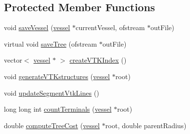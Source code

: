 \subsection*{Protected Member Functions}
\begin{DoxyCompactItemize}
\item 
void \hyperlink{class_abstract_structured_c_c_o_tree_a02c0800be71a2da7ea0134cf9ced320a}{save\+Vessel} (\hyperlink{structvessel}{vessel} $\ast$current\+Vessel, ofstream $\ast$out\+File)
\item 
virtual void \hyperlink{class_abstract_structured_c_c_o_tree_a16fb849f7fa74189c6b74c60ce59e776}{save\+Tree} (ofstream $\ast$out\+File)
\item 
vector$<$ \hyperlink{structvessel}{vessel} $\ast$ $>$ \hyperlink{class_abstract_structured_c_c_o_tree_a1e8da693a2c1b559c83e77198dfb0305}{create\+V\+T\+K\+Index} ()
\item 
void \hyperlink{class_abstract_structured_c_c_o_tree_a167b0a813fb29104fd63c374e6180f0f}{generate\+V\+T\+Kstructures} (\hyperlink{structvessel}{vessel} $\ast$root)
\item 
void \hyperlink{class_abstract_structured_c_c_o_tree_ad79bddcfc045a3d558669f628ee323f5}{update\+Segment\+Vtk\+Lines} ()
\item 
long long int \hyperlink{class_abstract_structured_c_c_o_tree_a541110b1a550a8a521306caa25d11e45}{count\+Terminals} (\hyperlink{structvessel}{vessel} $\ast$root)
\item 
double \hyperlink{class_abstract_structured_c_c_o_tree_abfb3473aada3b001ec83c3f0ab3e7e03}{compute\+Tree\+Cost} (\hyperlink{structvessel}{vessel} $\ast$root, double parent\+Radius)
\end{DoxyCompactItemize}
